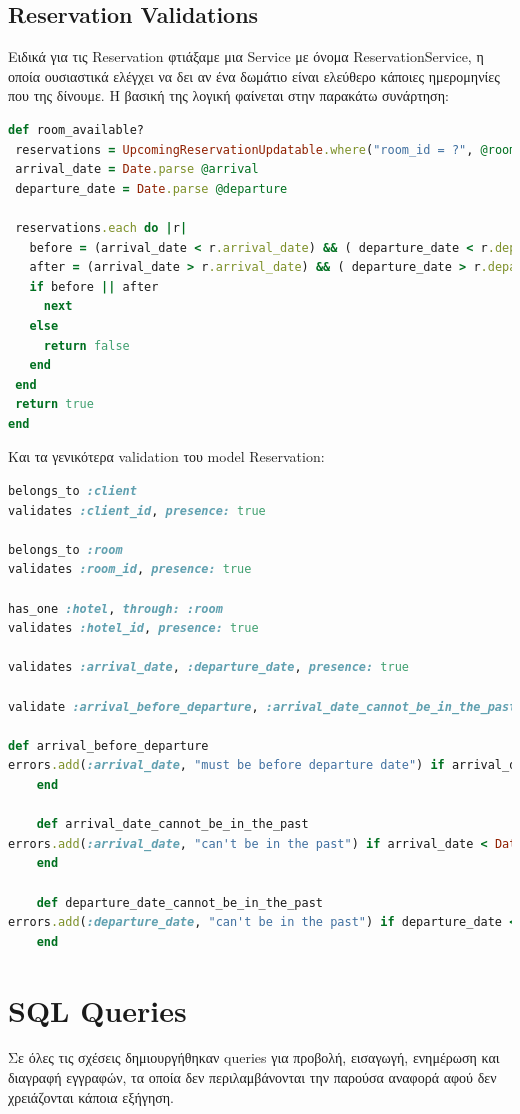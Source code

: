 \documentclass[a4paper,12pt]{article}
\begin{document}
\subsection{Reservation Validations}
	Ειδικά για τις Reservation φτιάξαμε μια Service με όνομα ReservationService, η οποία ουσιαστικά ελέγχει να δει αν ένα δωμάτιο είναι ελεύθερο κάποιες ημερομηνίες που της δίνουμε. Η βασική της λογική φαίνεται στην παρακάτω συνάρτηση:
	
	\begin{lstlisting}[language=Ruby]
def room_available?
 reservations = UpcomingReservationUpdatable.where("room_id = ?", @room.id)
 arrival_date = Date.parse @arrival
 departure_date = Date.parse @departure

 reservations.each do |r|
   before = (arrival_date < r.arrival_date) && ( departure_date < r.departure_date)
   after = (arrival_date > r.arrival_date) && ( departure_date > r.departure_date)
   if before || after
     next
   else
     return false
   end
 end
 return true
end
	\end{lstlisting}
	Και τα γενικότερα validation του model Reservation:
	\begin{lstlisting}[language=Ruby]
belongs_to :client
validates :client_id, presence: true

belongs_to :room
validates :room_id, presence: true

has_one :hotel, through: :room
validates :hotel_id, presence: true

validates :arrival_date, :departure_date, presence: true

validate :arrival_before_departure, :arrival_date_cannot_be_in_the_past, :departure_date_cannot_be_in_the_past

def arrival_before_departure
errors.add(:arrival_date, "must be before departure date") if arrival_date >= departure_date
 	end

 	def arrival_date_cannot_be_in_the_past
errors.add(:arrival_date, "can't be in the past") if arrival_date < Date.today
 	end

 	def departure_date_cannot_be_in_the_past
errors.add(:departure_date, "can't be in the past") if departure_date < Date.today
 	end
	\end{lstlisting}

\section{SQL Queries}
Σε όλες τις σχέσεις δημιουργήθηκαν queries για προβολή, εισαγωγή, ενημέρωση και διαγραφή εγγραφών, τα οποία δεν περιλαμβάνονται την παρούσα αναφορά αφού δεν χρειάζονται κάποια εξήγηση.
\end{document}
